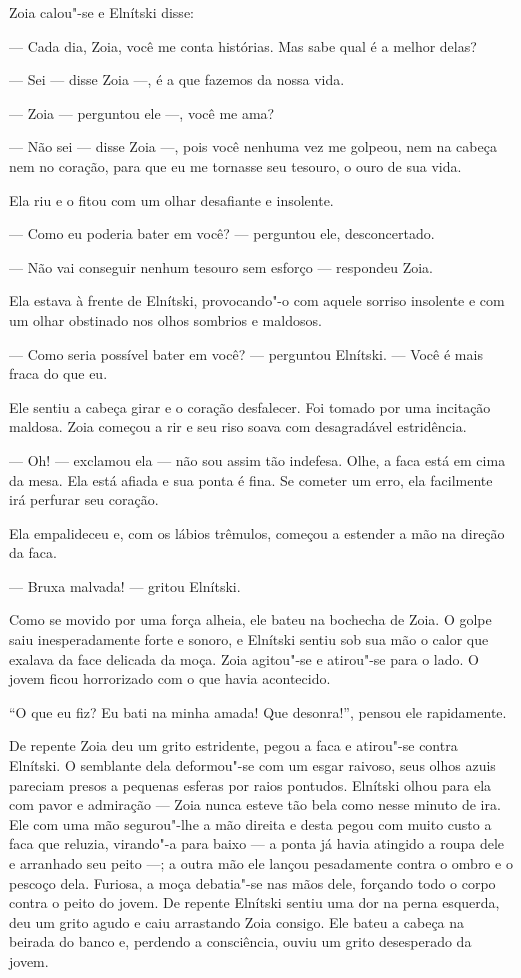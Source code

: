 Zoia calou"-se e Elnítski disse:

--- Cada dia, Zoia, você me conta histórias. Mas sabe qual é a melhor
delas?

--- Sei --- disse Zoia ---, é a que fazemos da nossa vida.

--- Zoia --- perguntou ele ---, você me ama?

--- Não sei --- disse Zoia ---, pois você nenhuma vez me golpeou, nem na
cabeça nem no coração, para que eu me tornasse seu tesouro, o ouro de
sua vida.

Ela riu e o fitou com um olhar desafiante e insolente.

--- Como eu poderia bater em você? --- perguntou ele, desconcertado.

--- Não vai conseguir nenhum tesouro sem esforço --- respondeu Zoia.

Ela estava à frente de Elnítski, provocando"-o com aquele sorriso
insolente e com um olhar obstinado nos olhos sombrios e maldosos.

--- Como seria possível bater em você? --- perguntou Elnítski. --- Você
é mais fraca do que eu.

Ele sentiu a cabeça girar e o coração desfalecer. Foi tomado por uma
incitação maldosa. Zoia começou a rir e seu riso soava com desagradável
estridência.

--- Oh! --- exclamou ela --- não sou assim tão indefesa. Olhe, a faca
está em cima da mesa. Ela está afiada e sua ponta é fina. Se cometer um
erro, ela facilmente irá perfurar seu coração.

Ela empalideceu e, com os lábios trêmulos, começou a estender a mão na
direção da faca.

--- Bruxa malvada! --- gritou Elnítski.

Como se movido por uma força alheia, ele bateu na bochecha de Zoia. O
golpe saiu inesperadamente forte e sonoro, e Elnítski sentiu sob sua mão
o calor que exalava da face delicada da moça. Zoia agitou"-se e atirou"-se
para o lado. O jovem ficou horrorizado com o que havia acontecido.

``O que eu fiz? Eu bati na minha amada! Que desonra!'', pensou ele
rapidamente.

De repente Zoia deu um grito estridente, pegou a faca e atirou"-se contra
Elnítski. O semblante dela deformou"-se com um esgar raivoso, seus olhos
azuis pareciam presos a pequenas esferas por raios pontudos. Elnítski
olhou para ela com pavor e admiração --- Zoia nunca esteve tão bela como
nesse minuto de ira. Ele com uma mão segurou"-lhe a mão direita e desta
pegou com muito custo a faca que reluzia, virando"-a para baixo --- a
ponta já havia atingido a roupa dele e arranhado seu peito ---; a outra
mão ele lançou pesadamente contra o ombro e o pescoço dela. Furiosa, a
moça debatia"-se nas mãos dele, forçando todo o corpo contra o peito do
jovem. De repente Elnítski sentiu uma dor na perna esquerda, deu um
grito agudo e caiu arrastando Zoia consigo. Ele bateu a cabeça na
beirada do banco e, perdendo a consciência, ouviu um grito desesperado
da jovem.

